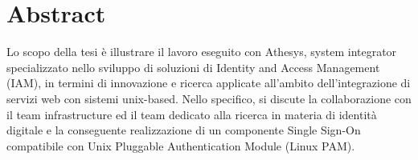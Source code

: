 
\cleardoublepage
{}
{}
\begingroup
\let\clearpage\relax
\let\cleardoublepage\relax
\let\cleardoublepage\relax

\chapter*{Abstract}

Lo scopo della tesi è illustrare il lavoro eseguito con Athesys, system integrator specializzato nello sviluppo di soluzioni di Identity and Access Management (IAM), in termini di innovazione e ricerca applicate all'ambito dell'integrazione di servizi web con sistemi unix-based. Nello specifico, si discute la collaborazione con il team infrastructure ed il team dedicato alla ricerca in materia di identità digitale e la conseguente realizzazione di un componente Single Sign-On compatibile con Unix Pluggable Authentication Module (Linux PAM). ​

%
%

\endgroup			

\vfill

